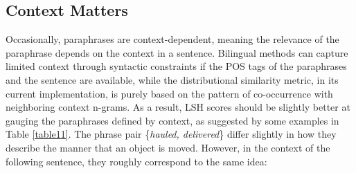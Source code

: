 \documentclass[11pt]{article}
\newcommand{\mnote}[1]{\marginpar{\raggedleft\footnotesize\itshape#1}}
\begin{document}

\subsection{Context Matters}
Occasionally, paraphrases are context-dependent, meaning the relevance of the paraphrase depends on the context in a sentence. Bilingual methods can capture limited context through syntactic constraints if the POS tags of the paraphrases and the sentence are available, while the distributional similarity metric, in its current implementation, is purely based on the pattern of co-occurrence with neighboring context n-grams. As a result, LSH scores should be slightly better at gauging the paraphrases defined by context, as suggested by some examples in Table \ref{table11}. The phrase pair \{\emph{hauled, delivered}\} differ slightly in how they describe the manner that an object is moved. However, in the context of the following sentence, they roughly correspond to the same idea:
\end{document}
